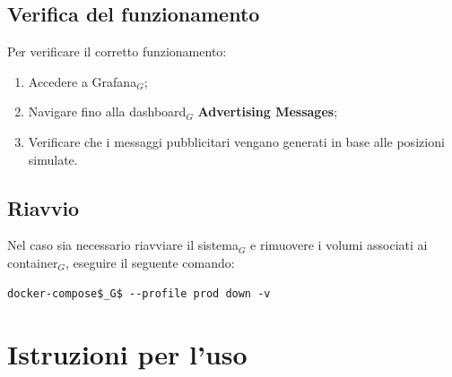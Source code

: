 \documentclass[10pt]{article}
\begin{document}
\begin{justify}
\subsection{Verifica del funzionamento}
Per verificare il corretto funzionamento:
\begin{enumerate}
    \item Accedere a Grafana$_G$;
    \item Navigare fino alla dashboard$_G$ \textbf{Advertising Messages};
    \item Verificare che i messaggi pubblicitari vengano generati in base alle posizioni simulate.
\end{enumerate}

\subsection{Riavvio}
Nel caso sia necessario riavviare il sistema$_G$ e rimuovere i volumi associati ai container$_G$, eseguire il seguente comando:
\begin{verbatim}
docker-compose$_G$ --profile prod down -v
\end{verbatim}


\newpage


\section{Istruzioni per l'uso}
\label{sec:uso}


\end{justify}
\end{document}
